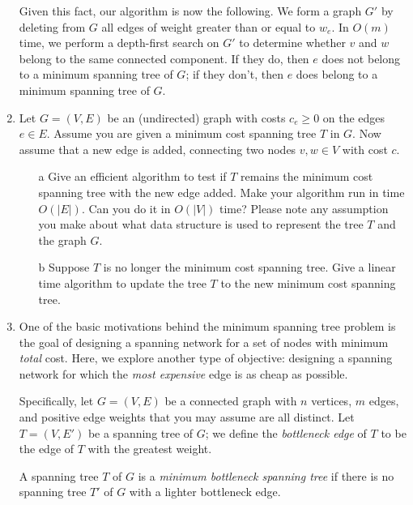 \documentclass[12pt]{article}
\begin{document}
\begin{enumerate}
{Given this fact, our algorithm is now the following.
We form a graph $G'$ by deleting from $G$ all
edges of weight greater than or equal to $w_e$.
In $O(m)$ time, we perform a depth-first search on $G'$
to determine whether $v$ and $w$ belong to the
same connected component.
If they do, then $e$ does not belong to a minimum spanning tree of $G$;
if they don't, then $e$ does belong to a minimum spanning tree of $G$.
}



\item

Let $G=(V,E)$ be an (undirected) graph with
costs $c_e \ge 0$ on the edges $e \in E$. Assume you are given a
minimum cost spanning tree $T$ in $G$. Now assume that a new edge
is added, connecting two nodes $v,w \in V$ with cost $c$.
\begin{itemize}
\item[a] Give an efficient algorithm to test if $T$ remains the minimum
cost spanning tree with the new edge added. Make your algorithm run in
time $O(|E|)$. Can you do it in $O(|V|)$ time? Please note any
assumption  you make about what data structure is used
to represent the tree $T$ and the graph $G$.
\item[b] Suppose $T$ is no longer the minimum cost spanning tree.
Give a linear time algorithm to update the tree $T$ to the new minimum cost
spanning tree.
\end{itemize}



\item

One of the basic motivations behind the minimum
spanning tree problem is the goal of designing a spanning
network for a set of nodes with minimum {\em total} cost.
Here, we explore another type of objective:
designing a spanning network for which the {\em most expensive} edge
is as cheap as possible.

Specifically, let $G = (V,E)$ be a connected graph with
$n$ vertices, $m$ edges, and positive edge weights that you may
assume are all distinct.
Let $T = (V,E')$ be a spanning tree of $G$; we define
the {\em bottleneck edge} of $T$ to be the edge of $T$
with the greatest weight.

A spanning tree $T$ of $G$ is a {\em minimum bottleneck spanning tree}
if there is no spanning tree $T'$ of $G$ with a lighter
bottleneck edge.


\end{enumerate}
\end{document}
